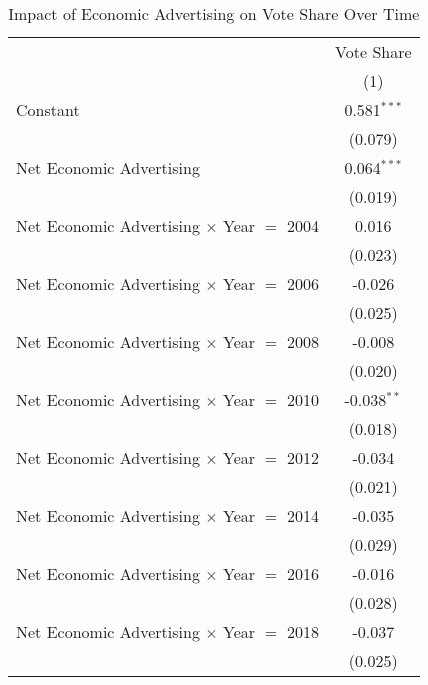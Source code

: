 
\begin{table}[htbp]
   \caption{Impact of Economic Advertising on Vote Share Over Time}
   \bigskip
   \centering
   \small
   \begin{tabular}{lc}
      \toprule
                                                       & Vote Share\\  
                                                       & (1)\\  
      \midrule 
      Constant                                         & 0.581$^{***}$\\   
                                                       & (0.079)\\   
      Net Economic Advertising                         & 0.064$^{***}$\\   
                                                       & (0.019)\\   
      Net Economic Advertising $\times$ Year $=$ 2004  & 0.016\\   
                                                       & (0.023)\\   
      Net Economic Advertising $\times$ Year $=$ 2006  & -0.026\\   
                                                       & (0.025)\\   
      Net Economic Advertising $\times$ Year $=$ 2008  & -0.008\\   
                                                       & (0.020)\\   
      Net Economic Advertising $\times$ Year $=$ 2010  & -0.038$^{**}$\\   
                                                       & (0.018)\\   
      Net Economic Advertising $\times$ Year $=$ 2012  & -0.034\\   
                                                       & (0.021)\\   
      Net Economic Advertising $\times$ Year $=$ 2014  & -0.035\\   
                                                       & (0.029)\\   
      Net Economic Advertising $\times$ Year $=$ 2016  & -0.016\\   
                                                       & (0.028)\\   
      Net Economic Advertising $\times$ Year $=$ 2018  & -0.037\\   
                                                       & (0.025)\\   

\end{tabular}
\end{table}
